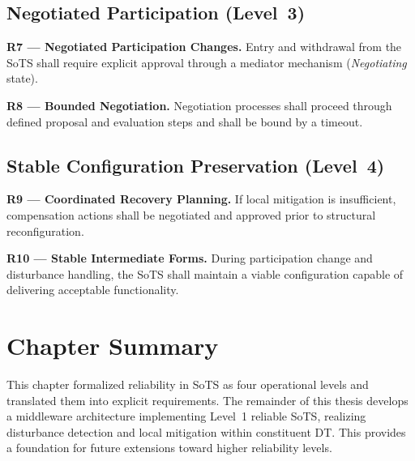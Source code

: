 \subsection{Negotiated Participation (Level~3)}

\textbf{R7 — Negotiated Participation Changes.}  
Entry and withdrawal from the SoTS shall require explicit approval through a mediator mechanism (\emph{Negotiating} state).

\noindent
\textbf{R8 — Bounded Negotiation.}  
Negotiation processes shall proceed through defined proposal and evaluation steps and shall be bound by a timeout.


\subsection{Stable Configuration Preservation (Level~4)}

\textbf{R9 — Coordinated Recovery Planning.}  
If local mitigation is insufficient, compensation actions shall be negotiated and approved prior to structural reconfiguration.

\noindent
\textbf{R10 — Stable Intermediate Forms.}  
During participation change and disturbance handling, the SoTS shall maintain a viable configuration capable of delivering acceptable functionality.


\section*{Chapter Summary}
This chapter formalized reliability in SoTS as four operational levels and translated them into explicit requirements. The remainder of this thesis develops a middleware architecture implementing Level~1 reliable SoTS, realizing disturbance detection and local mitigation within constituent DT. This provides a foundation for future extensions toward higher reliability levels.